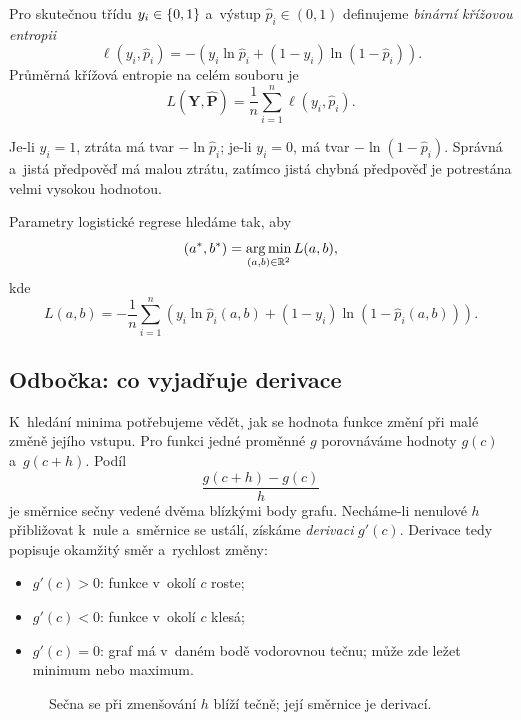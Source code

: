 \begin{definition}\label{def:ai-bce}
    Pro skutečnou třídu \(y_i\in\left\{0,1\right\}\) a~výstup
    \(\hat p_i\in(0,1)\) definujeme \emph{binární křížovou entropii}
    \[
        \ell(y_i,\hat p_i)
        =
        -
        \left(
            y_i\ln\hat p_i
            +(1-y_i)\ln(1-\hat p_i)
        \right).
    \]
    Průměrná křížová entropie na celém souboru je
    \[
        L(\mathbf{Y},\hat{\mathbf{P}})
        =
        \frac1n\sum_{i=1}^{n}\ell(y_i,\hat p_i).
    \]
\end{definition}

Je-li \(y_i=1\), ztráta má tvar \(-\ln\hat p_i\); je-li \(y_i=0\), má tvar \(-\ln(1-\hat p_i)\). Správná a~jistá předpověď má malou ztrátu, zatímco jistá chybná předpověď je potrestána velmi vysokou hodnotou.

Parametry logistické regrese hledáme tak, aby
\[
    (a^\ast,b^\ast)
    =
    \operatorname*{arg\,min}_{(a,b)\in\mathbb{R}^2}L(a,b),
\]
kde
\[
    L(a,b)
    =
    -\frac1n\sum_{i=1}^{n}
    \left(
        y_i\ln\hat p_i(a,b)
        +(1-y_i)\ln(1-\hat p_i(a,b))
    \right).
\]

\subsection{Odbočka: co vyjadřuje derivace}\label{subsec:ai-derivace}

K~hledání minima potřebujeme vědět, jak se hodnota funkce změní při malé změně jejího vstupu. Pro funkci jedné proměnné \(g\) porovnáváme hodnoty \(g(c)\) a~\(g(c+h)\). Podíl
\[
    \frac{g(c+h)-g(c)}{h}
\]
je směrnice sečny vedené dvěma blízkými body grafu. Necháme-li nenulové \(h\) přibližovat k~nule a~směrnice se ustálí, získáme \emph{derivaci} \(g'(c)\). Derivace tedy popisuje okamžitý směr a~rychlost změny:
\begin{itemize}
    \item \(g'(c)>0\): funkce v~okolí \(c\) roste;
    \item \(g'(c)<0\): funkce v~okolí \(c\) klesá;
    \item \(g'(c)=0\): graf má v~daném bodě vodorovnou tečnu; může zde ležet minimum nebo maximum.
\end{itemize}

\begin{figure}[ht]
    \centering
    
    \caption{Sečna se při zmenšování \(h\) blíží tečně; její směrnice je derivací.}
    \label{fig:ai-derivace}
\end{figure}

